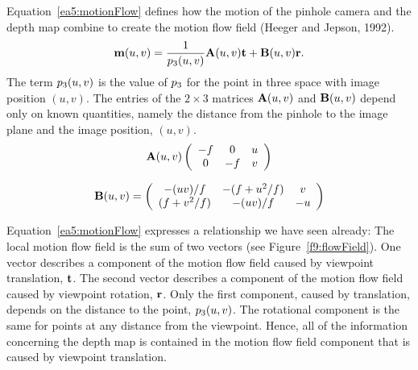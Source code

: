 Equation~\ref{ea5:motionFlow} defines how the motion of the pinhole
camera and the depth map combine to create the motion flow field
(Heeger and Jepson, 1992).
\begin{equation}
\label{ea5:motionFlow}
\mbox{${\bf m}(u,v)$} = 
 \frac{1}{\mbox{${p}_{3}$}(u,v)} \mbox{${\bf A}$}(u,v) \mbox{${\bf t}$} + \mbox{${\bf B}$}(u,v) \mbox{${\bf r}$} .
\end{equation} 
The term $\mbox{${p}_{3}$}(u,v)$ is the value of $\mbox{${p}_{3}$}$ for the point
in three space with image position $(u,v)$.  The entries of the $2
\times 3$ matrices $\mbox{${\bf A}$}(u,v)$ and $\mbox{${\bf B}$}(u,v)$ depend only on
known quantities, namely the distance from the pinhole to the image
plane and the image position, $(u,v)$.
\[
\mbox{${\bf A}$}(u,v)
\left( \begin{array}{ccc} -f & 0 & u \\ 0 & -f & v \end{array}
\right)
\]

\[
\mbox{${\bf B}$}(u,v) =
\left( \begin{array}{ccc} -(uv)/f & -(f + u^2/f) & v \\ (f + v^2/f) &
 -(uv)/f & -u \end{array}
\right)
\]

Equation~\ref{ea5:motionFlow} expresses a relationship we have seen
already: The local motion flow field is the sum of two vectors (see
Figure~\ref{f9:flowField}).  One vector describes a component of the
motion flow field caused by viewpoint translation, $\mbox{${\bf t}$}$. The
second vector describes a component of the motion flow field caused by
viewpoint rotation, $\mbox{${\bf r}$}$.  Only the first component, caused by
translation, depends on the distance to the point,
$\mbox{${p}_{3}$}(u,v)$.  The rotational component is the same for points
at any distance from the viewpoint.  Hence, all of the information
concerning the depth map is contained in the motion flow field
component that is caused by viewpoint translation.

